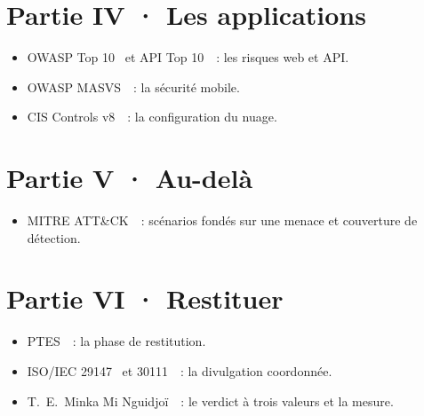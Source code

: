 \section*{Partie IV · Les applications}
\begin{itemize}
    \item OWASP Top 10~\cite{owasptop10} et API Top 10~\cite{owaspapitop10}~: les risques web et API.
    \item OWASP MASVS~\cite{owaspmasvs}~: la sécurité mobile.
    \item CIS Controls v8~\cite{cis2021controls}~: la configuration du nuage.
\end{itemize}

\section*{Partie V · Au-delà}
\begin{itemize}
    \item MITRE ATT\&CK~\cite{mitreattack}~: scénarios fondés sur une menace et couverture de détection.
\end{itemize}

\section*{Partie VI · Restituer}
\begin{itemize}
    \item PTES~\cite{ptes}~: la phase de restitution.
    \item ISO/IEC 29147~\cite{iso29147} et 30111~\cite{iso30111}~: la divulgation coordonnée.
    \item T.~E.~Minka Mi Nguidjoï~\cite{minka2026auditologie}~: le verdict à trois valeurs et la mesure.
\end{itemize}
